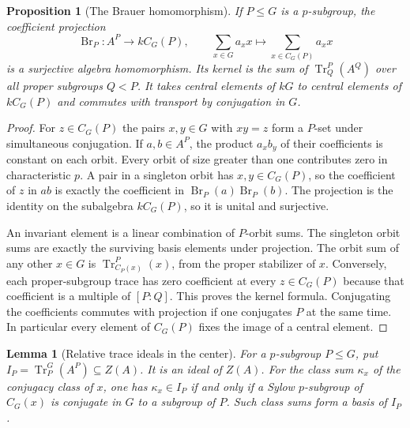 \documentclass[11pt,oneside,openany]{book}
\newtheorem{lemma}[theorem]{Lemma}
\newtheorem{proposition}[theorem]{Proposition}
\theoremstyle{definition}
\theoremstyle{remark}
\begin{document}
\begin{proposition}[The Brauer homomorphism]
\label{res:MR10}
If \(P\leq G\) is a \(p\)-subgroup, the coefficient projection
\[
 \operatorname{Br}_P:A^P\longrightarrow kC_G(P),\qquad
 \sum_{x\in G}a_xx\longmapsto\sum_{x\in C_G(P)}a_xx
\]
is a surjective algebra homomorphism. Its kernel is the sum
of \(\operatorname{Tr}_Q^P(A^Q)\) over all proper subgroups
\(Q<P\). It takes central elements of \(kG\) to central
elements of \(kC_G(P)\) and commutes with transport by
conjugation in \(G\).
\end{proposition}

\begin{proof}
For \(z\in C_G(P)\) the pairs \(x,y\in G\) with \(xy=z\) form
a \(P\)-set under simultaneous conjugation. If \(a,b\in A^P\),
the product \(a_xb_y\) of their coefficients is constant on
each orbit. Every orbit of size greater than one contributes
zero in characteristic \(p\). A pair in a singleton orbit
has \(x,y\in C_G(P)\), so the coefficient of \(z\) in \(ab\)
is exactly the coefficient in
\(\operatorname{Br}_P(a)\operatorname{Br}_P(b)\).
The projection is the identity on the subalgebra \(kC_G(P)\),
so it is unital and surjective.

An invariant element is a linear combination of \(P\)-orbit
sums. The singleton orbit sums are exactly the surviving basis
elements under projection. The orbit sum of any other \(x\in G\)
is \(\operatorname{Tr}_{C_P(x)}^P(x)\), from the proper
stabilizer of \(x\). Conversely, each proper-subgroup trace
has zero coefficient at every \(z\in C_G(P)\) because that
coefficient is a multiple of \([P:Q]\). This proves the kernel
formula. Conjugating the coefficients commutes with projection
if one conjugates \(P\) at the same time. In particular every
element of \(C_G(P)\) fixes the image of a central element.
\end{proof}

\begin{lemma}[Relative trace ideals in the center]
\label{res:MR11}
For a \(p\)-subgroup \(P\leq G\), put
\(I_P=\operatorname{Tr}_P^G(A^P)\subseteq Z(A)\).
It is an ideal of \(Z(A)\). For the class sum \(\kappa_x\)
of the conjugacy class of \(x\), one has \(\kappa_x\in I_P\)
if and only if a Sylow \(p\)-subgroup of \(C_G(x)\) is
conjugate in \(G\) to a subgroup of \(P\). Such class sums
form a basis of \(I_P\).
\end{lemma}
\end{document}
